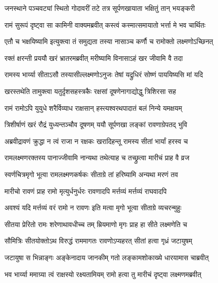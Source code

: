 \twolineshloka
{जनस्थाने पञ्चवट्यां स्थितो गोदावरीं तटे}
{तत्र सूर्पणखायाता भक्षितुं तान् भयङ्करी}%

\twolineshloka
{रामं सुरूपं दृष्ट्वा सा कामिनी वाक्यमब्रवीत्}
{कस्त्वं कस्मात्समायातो भर्त्ता मे भव चार्थितः}%

\twolineshloka
{एतौ च भक्षयिष्यामि इत्युक्त्वा तं समुद्यता }
{तस्या नासाञ्च कर्णौ च रामोक्तो लक्ष्मणोऽच्छिनत्}%

\twolineshloka
{रक्तं क्षरन्ती प्रययौ खरं भ्रातरमब्रवीत्}
{मरीष्यामि विनासाऽहं खर जीवामि वै तदा}%

\twolineshloka
{रामस्य भार्य्या सीताऽसौ तस्यासील्लक्ष्मणोऽनुजः}
{तेषां यद्रुधिरं सोष्णं पाययिष्यसि मां यदि}%

\twolineshloka
{खरस्तथेति तामुक्त्वा यतुर्दृशसहस्त्रकैः}
{रक्षसां दूषणेनागाद्योद्धु त्रिशिरसा सह}%

\twolineshloka
{रामं रामोऽपि युयुधे शरैर्विव्याध राक्षसान्}
{हस्त्यश्वरथपादातं बलं निन्ये यमक्षयम्}%

\twolineshloka
{त्रिशीर्षाणं खरं रौद्रं युध्यन्तञ्चौव दूषणम्}
{ययौ सूर्पणखा लङ्कां रावणाग्रेपतद् भुवि}%

\twolineshloka
{अब्रवीद्रावणं क्रुद्धा न त्वं राजा न रक्षकः}
{खरादिहन्तू रामस्य सीतां भार्यां हरस्व च}%

\twolineshloka
{रामलक्ष्मणरक्तस्य पानाज्जीवामि नान्यथा}
{तथेत्याह च तच्छ्रुत्वा मारीचं प्राह वै व्रज}%

\twolineshloka
{स्वर्णचित्रमृगो भूत्वा रामलक्ष्मणकर्षकः}
{सीताग्रे तां हरिष्यामि अन्यथा मरणं तव}%

\twolineshloka
{मारीचो रावणं प्राह रामो मृत्युर्धनुर्धरः}
{रावणादपि मर्त्तव्यं मर्त्तव्यं राघवादपि}%

\twolineshloka
{अवश्यं यदि मर्त्तव्यं वरं रामो न रावणः}
{इति मत्वा मृगो भूत्वा सीताग्रे व्यचरन्मुहुः}%

\twolineshloka
{सीतया प्रेरितो रामः शरेणाथावधीच्च तम्}
{म्रियमाणो मृगः प्राह हा सीते लक्ष्मणेति च}%

\twolineshloka
{सौमित्रिः सीतयोक्तोऽथ विरुद्धं राममागतः}
{रावणोऽप्यहरत् सीतां हत्वा गृध्रं जटायुषम्}%

\twolineshloka
{जटायुषा स भिन्नाङ्गः अङ्केनादाय जानकीम्}
{गतो लङ्कामशोकाख्ये धारयामास चाब्रवीत्}%

\twolineshloka
{भव भार्य्या ममाग्र्या त्वं राक्षस्यो रक्ष्यतामियम् }
{रामो हत्वा तु मारीचं दृष्ट्वा लक्ष्मणमब्रवीत्}%

